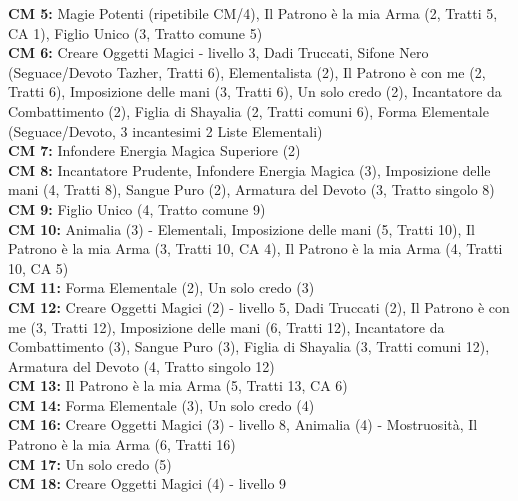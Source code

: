 \begin{multicols}{2}
	\textbf{CM 5:} Magie Potenti (ripetibile CM/4), Il Patrono è la mia Arma (2, Tratti 5, CA 1), Figlio Unico (3, Tratto comune 5)\\

	\textbf{CM 6:} Creare Oggetti Magici - livello 3, Dadi Truccati, Sifone Nero (Seguace/Devoto Tazher, Tratti 6), Elementalista (2), Il Patrono è con me (2, Tratti 6), Imposizione delle mani (3, Tratti 6), Un solo credo (2), Incantatore da Combattimento (2), Figlia di Shayalia (2, Tratti comuni 6), Forma Elementale (Seguace/Devoto, 3 incantesimi 2 Liste Elementali)\\

	\textbf{CM 7:} Infondere Energia Magica Superiore (2)\\

	\textbf{CM 8:} Incantatore Prudente, Infondere Energia Magica (3), Imposizione delle mani (4, Tratti 8), Sangue Puro (2), Armatura del Devoto (3, Tratto singolo 8)\\

	\textbf{CM 9:} Figlio Unico (4, Tratto comune 9)\\

	\textbf{CM 10:} Animalia (3) - Elementali, Imposizione delle mani (5, Tratti 10), Il Patrono è la mia Arma (3, Tratti 10, CA 4), Il Patrono è la mia Arma (4, Tratti 10, CA 5)\\

	\textbf{CM 11:} Forma Elementale (2), Un solo credo (3)\\

	\textbf{CM 12:} Creare Oggetti Magici (2) - livello 5, Dadi Truccati (2), Il Patrono è con me (3, Tratti 12), Imposizione delle mani (6, Tratti 12), Incantatore da Combattimento (3), Sangue Puro (3), Figlia di Shayalia (3, Tratti comuni 12), Armatura del Devoto (4, Tratto singolo 12)\\

	\textbf{CM 13:} Il Patrono è la mia Arma (5, Tratti 13, CA 6)\\

	\textbf{CM 14:} Forma Elementale (3), Un solo credo (4)\\

	\textbf{CM 16:} Creare Oggetti Magici (3) - livello 8, Animalia (4) - Mostruosità, Il Patrono è la mia Arma (6, Tratti 16)\\

	\textbf{CM 17:} Un solo credo (5)\\

	\textbf{CM 18:} Creare Oggetti Magici (4) - livello 9\\


\end{multicols}
